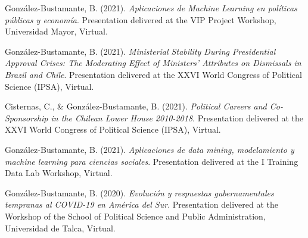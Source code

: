 \begin{publications}
\begin{benumerate}{87}
\item{González-Bustamante, B. (2021). {\itshape Aplicaciones de Machine Learning en políticas públicas y economía}. Presentation delivered at the VIP Project Workshop, Universidad Mayor, Virtual.}\vspace{1mm}

\item{González-Bustamante, B. (2021). {\itshape Ministerial Stability During Presidential Approval Crises: The Moderating Effect of Ministers' Attributes on Dismissals in Brazil and Chile}. Presentation delivered at the XXVI World Congress of Political Science (IPSA), Virtual.}\vspace{1mm}

\item{Cisternas, C., \& González-Bustamante, B. (2021). {\itshape Political Careers and Co-Sponsorship in the Chilean Lower House 2010-2018}. Presentation delivered at the XXVI World Congress of Political Science (IPSA), Virtual.}\vspace{1mm}


\item{González-Bustamante, B. (2021). {\itshape Aplicaciones de data mining, modelamiento y machine learning para ciencias sociales}. Presentation delivered at the I Training Data Lab Workshop, Virtual.}\vspace{1mm}


\item{González-Bustamante, B. (2020). {\itshape Evolución y respuestas gubernamentales tempranas al COVID-19 en América del Sur}. Presentation delivered at the Workshop of the School of Political Science and Public Administration, Universidad de Talca, Virtual.}\vspace{1mm}



\end{benumerate}
\end{publications}
